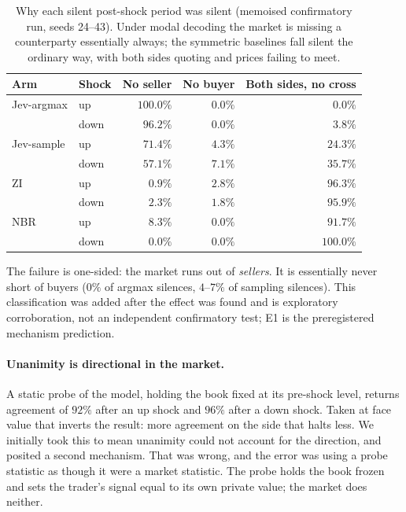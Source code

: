 \documentclass[11pt]{article}
\begin{document}
\begin{table}[t]
\centering
\begin{tabular}{llrrr}
\toprule
Arm & Shock & No seller & No buyer & Both sides, no cross \\
\midrule
Jev-argmax & up   & $\mathbf{100.0\%}$ & $0.0\%$ & $0.0\%$ \\
           & down & $96.2\%$ & $0.0\%$ & $3.8\%$ \\
Jev-sample & up   & $71.4\%$ & $4.3\%$ & $24.3\%$ \\
           & down & $57.1\%$ & $7.1\%$ & $35.7\%$ \\
ZI         & up   & $0.9\%$  & $2.8\%$ & $96.3\%$ \\
           & down & $2.3\%$  & $1.8\%$ & $95.9\%$ \\
NBR        & up   & $8.3\%$  & $0.0\%$ & $91.7\%$ \\
           & down & $0.0\%$  & $0.0\%$ & $100.0\%$ \\
\bottomrule
\end{tabular}
\caption{Why each silent post-shock period was silent (memoised confirmatory run, seeds 24--43). Under
modal decoding the market is missing a counterparty essentially always; the
symmetric baselines fall silent the ordinary way, with both sides quoting and
prices failing to meet.}
\label{tab:silence}
\end{table}

The failure is one-sided: the market runs out of \emph{sellers}. It is
essentially never short of buyers ($0\%$ of argmax silences, $4$--$7\%$ of
sampling silences). This classification was added after the effect was found
and is exploratory corroboration, not an independent confirmatory test; E1 is
the preregistered mechanism prediction.

\paragraph{Unanimity is directional in the market.}
\label{par:two}
A static probe of the model, holding the book fixed at its pre-shock level,
returns agreement of $92\%$ after an up shock and $96\%$ after a down shock.
Taken at face value that inverts the result: more agreement on the side that
halts less. We initially took this to mean unanimity could not account for the
direction, and posited a second mechanism. That was wrong, and the error was
using a probe statistic as though it were a market statistic. The probe holds
the book frozen and sets the trader's signal equal to its own private value;
the market does neither.
\end{document}

